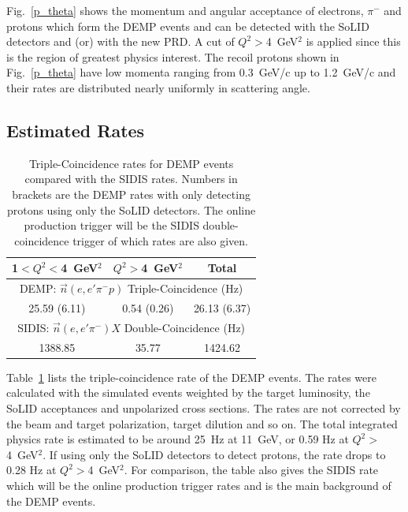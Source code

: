 Fig.~\ref{p_theta} shows the momentum and angular acceptance of electrons,
$\pi^{-}$ and protons which form the DEMP events and can be detected with the
SoLID detectors and (or) with the new PRD.  A cut of $Q^2>$4~GeV$^2$
is applied since this is the region of greatest physics interest.  The recoil
protons shown in Fig.~\ref{p_theta} have low momenta ranging from 0.3~GeV/c up
to 1.2~GeV/c and their rates are distributed nearly uniformly in scattering
angle.

\subsection{Estimated Rates}

\begin{table}[!ht]
\centering
\begin{tabular}{|c|c|c|}
 \hline
  1$<Q^2<$4~GeV$^2$ & $Q^2>$4~GeV$^2$ & Total\\
 \hline
\multicolumn{3}{|c|}{DEMP: $\vec{n}(e,e'\pi^{-}p)$ Triple-Coincidence (Hz)}\\
 \hline
 25.59 (6.11)   &  0.54 (0.26) & 26.13 (6.37)   \\
 \hline
\multicolumn{3}{|c|}{SIDIS: $\vec{n}(e,e'\pi^{-})X$ Double-Coincidence (Hz)}\\
 \hline
        1388.85 & 35.77        & 1424.62   \\
 \hline
\end{tabular}
\caption[Triple-Coincidence rates for
  neutron-DEMP]{\footnotesize{Triple-Coincidence rates for DEMP events compared
    with the SIDIS rates. Numbers in brackets are the DEMP rates with only
    detecting protons using only the SoLID detectors. The online production
    trigger will be the SIDIS double-coincidence trigger of which rates are
    also given.}}
\label{rate_table}
\end{table} 

Table~\ref{rate_table} lists the triple-coincidence rate of the DEMP
events. The rates were calculated with the simulated events weighted by the
target luminosity, the SoLID acceptances and unpolarized cross sections. The
rates are not corrected by the beam and target polarization, target dilution
and so on. The total integrated physics rate is estimated to be around 25~Hz at
11~GeV, or 0.59 Hz at $Q^{2}>$4~GeV$^{2}$. If using only the 
SoLID detectors to detect protons, the rate drops to 0.28 Hz at
$Q^{2}>$4~GeV$^{2}$.  For comparison, the table also gives the SIDIS rate
which will be the online production trigger rates and is the main background of
the DEMP events.

